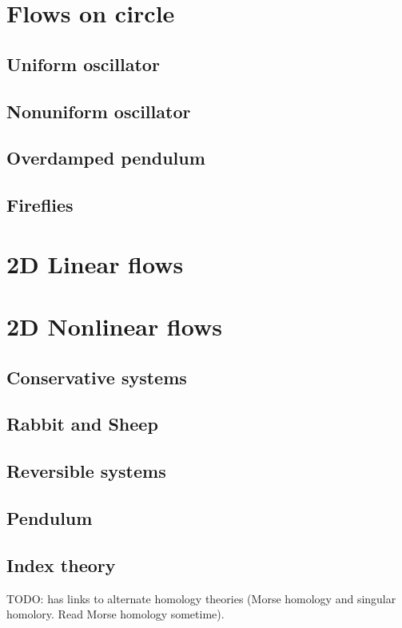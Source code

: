 \documentclass[11pt]{book}
\begin{document}
\section{Flows on circle}
\subsection{Uniform oscillator}
\subsection{Nonuniform oscillator}
\subsection{Overdamped pendulum}
\subsection{Fireflies}

\section{2D Linear flows}

\section{2D Nonlinear flows}
\subsection{Conservative systems}
\subsection{Rabbit and Sheep}
\subsection{Reversible systems}
\subsection{Pendulum}
\subsection{Index theory}
TODO: has links to alternate homology theories (Morse homology and singular 
homolory. Read Morse homology sometime).
\end{document}
